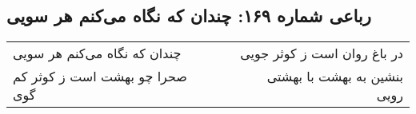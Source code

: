 \begin{center}
\section*{رباعی شماره ۱۶۹: چندان که نگاه می‌کنم هر سویی}
\label{sec:sh169}
\begin{longtable}{l p{0.5cm} r}
چندان که نگاه می‌کنم هر سویی
&&
در باغ روان است ز کوثر جویی
\\
صحرا چو بهشت است ز کوثر کم گوی
&&
بنشین به بهشت با بهشتی رویی
\\
\end{longtable}
\end{center}
